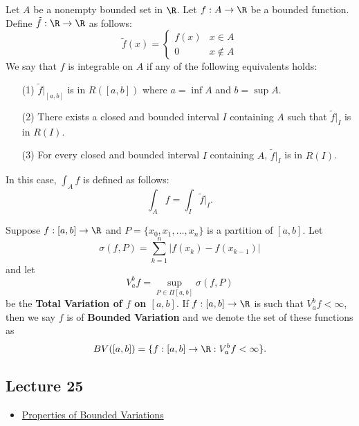 \begin{remark}
    Let \( A  \) be a nonempty bounded set in \( \R  \). Let \( f: A \to \R  \) be a bounded function. Define \( \tilde{f} : \R \to \R  \) as follows: 
    \[  \tilde{f}(x) = 
    \begin{cases}
        f(x) & x \in A  \\
        0 & x \notin A 
    \end{cases} \]
    We say that \( f  \) is integrable on \( A  \) if any of the following equivalents holds: 
    \begin{enumerate}
        \item[(1)] \( \tilde{f} \Big|_{[a,b]} \) is in \( R([a,b]) \) where \( a = \inf A  \) and \( b = \sup A  \).
        \item[(2)] There exists a closed and bounded interval \( I  \) containing \( A  \) such that \( \tilde{f} \Big|_{I} \) is in \( R(I) \).
        \item[(3)] For every closed and bounded interval \( I  \) containing \( A  \), \( \tilde{f} \Big|_{I} \) is in \( R(I) \).
    \end{enumerate}
    In this case, \( \int_{ A  } f   \) is defined as follows:
    \[  \int_{ A  } f  = \int_{ I  } \tilde{f} \Big|_{I}. \tag{where \( I  \) is any closed and bounded interval} \]
\end{remark}

\begin{definition}\label{Functions of bounded variation}
    Suppose \( f:[a,b] \to \R  \) and \( P = \{ {x}_{0}, {x}_{1}, \dots, {x}_{n} \}  \) is a partition of \( [a,b] \). Let 
    \[  \sigma(f,P) = \sum_{ k=1  }^{ n } | f({x}_{k}) - f({x}_{k-1}) |  \]
    and let 
    \[  {V}_{a}^{b} f = \sup_{P \in \Pi [a,b]} \sigma(f,P) \]
    be the \textbf{Total Variation of \( f  \) on \( [a,b] \)}. If \( f : [a,b] \to \R  \) is such that \( {V}_{a}^{b} f < \infty   \), then we say \( f  \) is of \textbf{Bounded Variation} and we denote the set of these functions as 
    \[  BV ([a,b]) = \{ f:[a,b] \to \R : {V}_{a}^{b} f < \infty  \}. \]
\end{definition}


\subsection{Lecture 25}

\begin{itemize}
    \item {\hyperref[Properties of Bounded Variations]{Properties of Bounded Variations}} 
\end{itemize}

